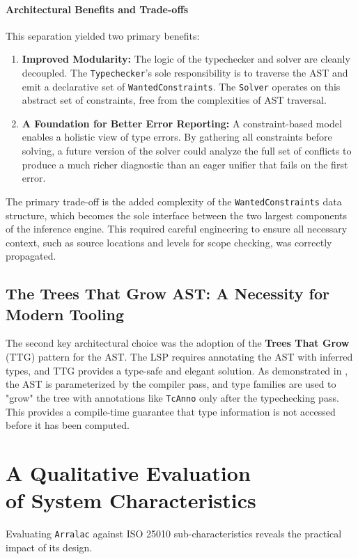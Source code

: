 \paragraph{Architectural Benefits and Trade-offs}
This separation yielded two primary benefits:
\begin{enumerate}
    \item \textbf{Improved Modularity:} The logic of the typechecker and solver are cleanly decoupled. The \texttt{Typechecker}'s sole responsibility is to traverse the AST and emit a declarative set of \texttt{WantedConstraints}. The \texttt{Solver} operates on this abstract set of constraints, free from the complexities of AST traversal.
    \item \textbf{A Foundation for Better Error Reporting:} A constraint-based model enables a holistic view of type errors. By gathering all constraints before solving, a future version of the solver could analyze the full set of conflicts to produce a much richer diagnostic than an eager unifier that fails on the first error.
\end{enumerate}

The primary trade-off is the added complexity of the \texttt{WantedConstraints} data structure, which becomes the sole interface between the two largest components of the inference engine. This required careful engineering to ensure all necessary context, such as source locations and levels for scope checking, was correctly propagated.

\subsection{The Trees That Grow AST: A Necessity for Modern Tooling}
The second key architectural choice was the adoption of the \textbf{Trees That Grow} (TTG) pattern for the AST. The LSP requires annotating the AST with inferred types, and TTG provides a type-safe and elegant solution. As demonstrated in , the AST is parameterized by the compiler pass, and type families are used to "grow" the tree with annotations like \texttt{TcAnno} only after the typechecking pass. This provides a compile-time guarantee that type information is not accessed before it has been computed.

\section{A Qualitative Evaluation \\ of System Characteristics}
\label{sec:Discussion:Characteristics}
Evaluating \texttt{Arralac} against ISO 25010 \cite{iso-25010} sub-characteristics reveals the practical impact of its design.

